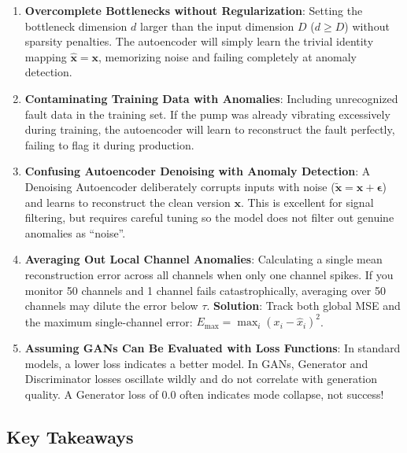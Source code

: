 \begin{warning}
\begin{enumerate}
    \item \textbf{Overcomplete Bottlenecks without Regularization}: Setting the bottleneck dimension $d$ larger than the input dimension $D$ ($d \ge D$) without sparsity penalties. The autoencoder will simply learn the trivial identity mapping $\hat{\mathbf{x}} = \mathbf{x}$, memorizing noise and failing completely at anomaly detection.
    \item \textbf{Contaminating Training Data with Anomalies}: Including unrecognized fault data in the training set. If the pump was already vibrating excessively during training, the autoencoder will learn to reconstruct the fault perfectly, failing to flag it during production.
    \item \textbf{Confusing Autoencoder Denoising with Anomaly Detection}: A Denoising Autoencoder deliberately corrupts inputs with noise ($\tilde{\mathbf{x}} = \mathbf{x} + \boldsymbol{\epsilon}$) and learns to reconstruct the clean version $\mathbf{x}$. This is excellent for signal filtering, but requires careful tuning so the model does not filter out genuine anomalies as ``noise''.
    \item \textbf{Averaging Out Local Channel Anomalies}: Calculating a single mean reconstruction error across all channels when only one channel spikes. If you monitor 50 channels and 1 channel fails catastrophically, averaging over 50 channels may dilute the error below $\tau$. \textbf{Solution}: Track both global MSE and the maximum single-channel error: $E_{\max} = \max_i (x_i - \hat{x}_i)^2$.
    \item \textbf{Assuming GANs Can Be Evaluated with Loss Functions}: In standard models, a lower loss indicates a better model. In GANs, Generator and Discriminator losses oscillate wildly and do not correlate with generation quality. A Generator loss of $0.0$ often indicates mode collapse, not success!
\end{enumerate}
\end{warning}

\subsection{Key Takeaways}\label{subsec:takeaways}

